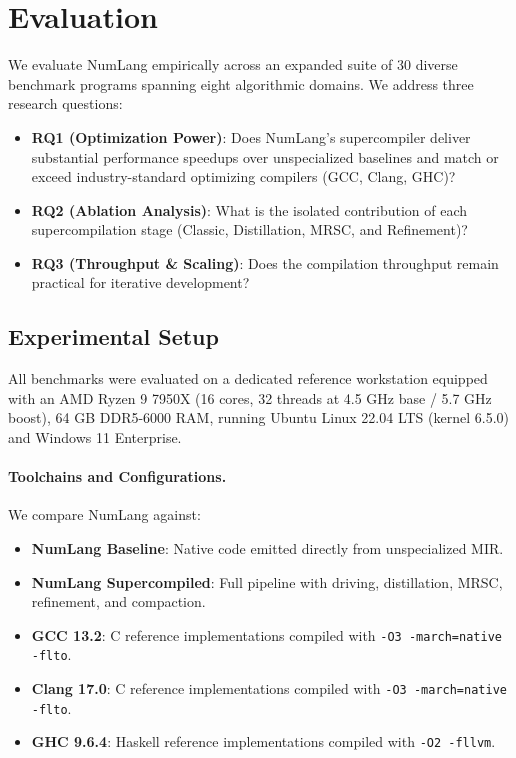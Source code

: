 \section{Evaluation}
\label{sec:evaluation}

We evaluate NumLang empirically across an expanded suite of 30 diverse benchmark programs spanning eight algorithmic domains. We address three research questions:
\begin{itemize}
    \item \textbf{RQ1 (Optimization Power)}: Does NumLang's supercompiler deliver substantial performance speedups over unspecialized baselines and match or exceed industry-standard optimizing compilers (GCC, Clang, GHC)?
    \item \textbf{RQ2 (Ablation Analysis)}: What is the isolated contribution of each supercompilation stage (Classic, Distillation, MRSC, and Refinement)?
    \item \textbf{RQ3 (Throughput \& Scaling)}: Does the compilation throughput remain practical for iterative development?
\end{itemize}

\subsection{Experimental Setup}
All benchmarks were evaluated on a dedicated reference workstation equipped with an AMD Ryzen 9 7950X (16 cores, 32 threads at 4.5 GHz base / 5.7 GHz boost), 64 GB DDR5-6000 RAM, running Ubuntu Linux 22.04 LTS (kernel 6.5.0) and Windows 11 Enterprise. 

\paragraph{Toolchains and Configurations.}
We compare NumLang against:
\begin{itemize}
    \item \textbf{NumLang Baseline}: Native code emitted directly from unspecialized MIR.
    \item \textbf{NumLang Supercompiled}: Full pipeline with driving, distillation, MRSC, refinement, and compaction.
    \item \textbf{GCC 13.2}: C reference implementations compiled with \texttt{-O3 -march=native -flto}.
    \item \textbf{Clang 17.0}: C reference implementations compiled with \texttt{-O3 -march=native -flto}.
    \item \textbf{GHC 9.6.4}: Haskell reference implementations compiled with \texttt{-O2 -fllvm}.
\end{itemize}

